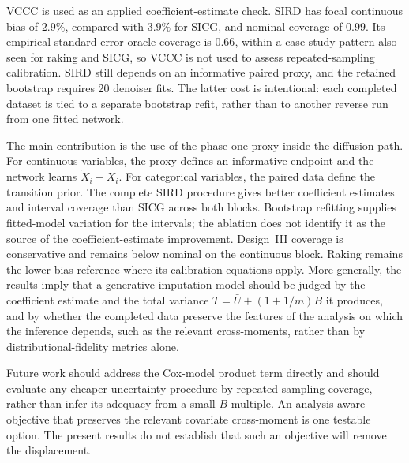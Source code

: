 VCCC is used as an applied coefficient-estimate check. SIRD has focal continuous bias of \(2.9\%\), compared with \(3.9\%\) for SICG, and nominal coverage of \(0.99\). Its empirical-standard-error oracle coverage is \(0.66\), within a case-study pattern also seen for raking and SICG, so VCCC is not used to assess repeated-sampling calibration. SIRD still depends on an informative paired proxy, and the retained bootstrap requires 20 denoiser fits. The latter cost is intentional: each completed dataset is tied to a separate bootstrap refit, rather than to another reverse run from one fitted network.

The main contribution is the use of the phase-one proxy inside the diffusion path. For continuous variables, the proxy defines an informative endpoint and the network learns \(\tilde X_i-X_i\). For categorical variables, the paired data define the transition prior. The complete SIRD procedure gives better coefficient estimates and interval coverage than SICG across both blocks. Bootstrap refitting supplies fitted-model variation for the intervals; the ablation does not identify it as the source of the coefficient-estimate improvement. Design~III coverage is conservative and remains below nominal on the continuous block. Raking remains the lower-bias reference where its calibration equations apply. More generally, the results imply that a generative imputation model should be judged by the coefficient estimate and the total variance \(T=\bar U+(1+1/m)B\) it produces, and by whether the completed data preserve the features of the analysis on which the inference depends, such as the relevant cross-moments, rather than by distributional-fidelity metrics alone.

Future work should address the Cox-model product term directly and should evaluate any cheaper uncertainty procedure by repeated-sampling coverage, rather than infer its adequacy from a small \(B\) multiple. An analysis-aware objective that preserves the relevant covariate cross-moment is one testable option. The present results do not establish that such an objective will remove the displacement.

